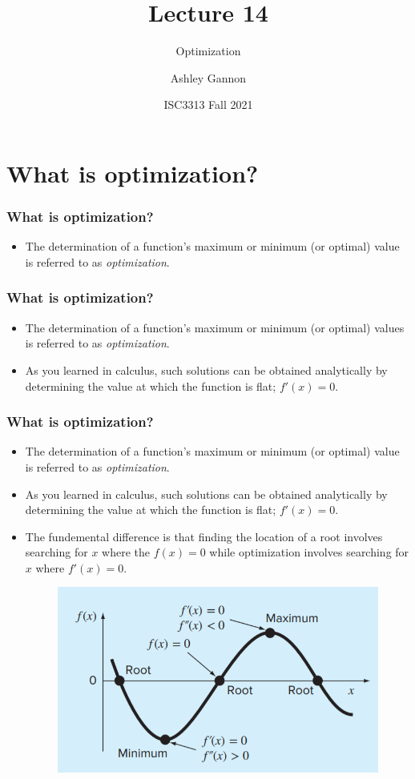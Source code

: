 \documentclass{if-beamer}
\title[Lecture 14]{Lecture 14}
\subtitle{Optimization}
\author{Ashley Gannon}
\date{ISC3313 Fall 2021}
\begin{document}
\begin{frame}
  \titlepage
\end{frame}
\section{What is optimization?}

\begin{frame}[t]
	\frametitle{What is optimization?}
	\begin{itemize}
		\item The determination of a function's maximum or minimum (or optimal) value is referred to as \textit{optimization}.
	\end{itemize}
\end{frame}

\begin{frame}[t]
	\frametitle{What is optimization?}
	\begin{itemize}
		\item The determination of a function's maximum or minimum (or optimal) values is referred to as \textit{optimization}.
		\item  As you learned in calculus, such solutions can be obtained analytically by determining the value at which the function is flat; $f'(x) = 0$.
	\end{itemize}
\end{frame}

\begin{frame}[t]
	\frametitle{What is optimization?}
	\begin{itemize}
		\item The determination of a function's maximum or minimum (or optimal) value is referred to as \textit{optimization}.
		\item  As you learned in calculus, such solutions can be obtained analytically by determining the value at which the function is flat; $f'(x) = 0$.
		\item The fundemental difference is that finding the location of a root  involves searching for $x$ where the $f(x) = 0$ while optimization involves searching for $x$ where $f'(x) = 0$.
		\begin{figure}
			\centering
			\includegraphics[width=.4\textwidth]{figures/optimavsroot}
		\end{figure}
	\end{itemize}
\end{frame}
\end{document}
